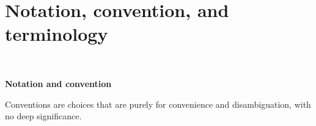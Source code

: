 

\chapter{Notation, convention, and terminology}\label{notation}

\renewcommand{\thefootnote}{\fnsymbol{footnote}}

\

\noindent\textbf{Notation and convention}


Conventions are choices that are purely for convenience and disambiguation, with no deep significance.

\newcommand{\nttn}[2]{\item[{\ \makebox[3.18cm][l]{#1}}]{#2}}
